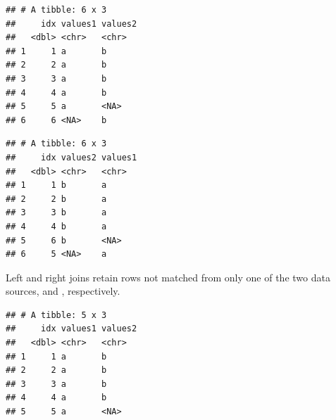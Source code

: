 \documentclass[krantz2]{krantz}\usepackage{knitr}
\begin{document}
\begin{knitrout}\footnotesize
{}\color{fgcolor}\begin{kframe}
\begin{alltt}
\hlstd{(}   
\end{alltt}


{\ttfamily\noindent\itshape{}}\begin{verbatim}
## # A tibble: 6 x 3
##     idx values1 values2
##   <dbl> <chr>   <chr>  
## 1     1 a       b      
## 2     2 a       b      
## 3     3 a       b      
## 4     4 a       b      
## 5     5 a       <NA>   
## 6     6 <NA>    b
\end{verbatim}
\end{kframe}
\end{knitrout}

\begin{knitrout}\footnotesize
{}\color{fgcolor}\begin{kframe}
\begin{alltt}
\hlstd{(}   
\end{alltt}


{\ttfamily\noindent\itshape{}}\begin{verbatim}
## # A tibble: 6 x 3
##     idx values2 values1
##   <dbl> <chr>   <chr>  
## 1     1 b       a      
## 2     2 b       a      
## 3     3 b       a      
## 4     4 b       a      
## 5     6 b       <NA>   
## 6     5 <NA>    a
\end{verbatim}
\end{kframe}
\end{knitrout}

Left and right joins retain rows not matched from only one of the two data sources,  and , respectively.

\begin{knitrout}\footnotesize
{}\color{fgcolor}\begin{kframe}
\begin{alltt}
\hlstd{(}   
\end{alltt}


{\ttfamily\noindent\itshape{}}\begin{verbatim}
## # A tibble: 5 x 3
##     idx values1 values2
##   <dbl> <chr>   <chr>  
## 1     1 a       b      
## 2     2 a       b      
## 3     3 a       b      
## 4     4 a       b      
## 5     5 a       <NA>
\end{verbatim}
\end{kframe}
\end{knitrout}
\end{document}
